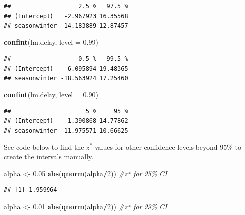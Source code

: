 \documentclass[
]{book}
\newenvironment{Shaded}{\begin{snugshade}}{\end{snugshade}}
\newcommand{\AttributeTok}[1]{\textcolor[rgb]{0.13,0.29,0.53}{#1}}
\newcommand{\CommentTok}[1]{\textcolor[rgb]{0.56,0.35,0.01}{\textit{#1}}}
\newcommand{\DecValTok}[1]{\textcolor[rgb]{0.00,0.00,0.81}{#1}}
\newcommand{\FloatTok}[1]{\textcolor[rgb]{0.00,0.00,0.81}{#1}}
\newcommand{\FunctionTok}[1]{\textcolor[rgb]{0.13,0.29,0.53}{\textbf{#1}}}
\newcommand{\NormalTok}[1]{#1}
\newcommand{\OtherTok}[1]{\textcolor[rgb]{0.56,0.35,0.01}{#1}}
\newcommand{\SpecialCharTok}[1]{\textcolor[rgb]{0.81,0.36,0.00}{\textbf{#1}}}
\begin{document}
\begin{verbatim}
##                   2.5 %   97.5 %
## (Intercept)   -2.967923 16.35568
## seasonwinter -14.183889 12.87457
\end{verbatim}

\begin{Shaded}
\begin{Highlighting}[]
\FunctionTok{confint}\NormalTok{(lm.delay, }\AttributeTok{level =} \FloatTok{0.99}\NormalTok{)}
\end{Highlighting}
\end{Shaded}

\begin{verbatim}
##                   0.5 %   99.5 %
## (Intercept)   -6.095894 19.48365
## seasonwinter -18.563924 17.25460
\end{verbatim}

\begin{Shaded}
\begin{Highlighting}[]
\FunctionTok{confint}\NormalTok{(lm.delay, }\AttributeTok{level =} \FloatTok{0.90}\NormalTok{)}
\end{Highlighting}
\end{Shaded}

\begin{verbatim}
##                     5 %     95 %
## (Intercept)   -1.390868 14.77862
## seasonwinter -11.975571 10.66625
\end{verbatim}

See code below to find the \(z^*\) values for other confidence levels beyond 95\% to create the intervals manually.

\begin{Shaded}
\begin{Highlighting}[]
\NormalTok{alpha }\OtherTok{\textless{}{-}} \FloatTok{0.05} 
\FunctionTok{abs}\NormalTok{(}\FunctionTok{qnorm}\NormalTok{(alpha}\SpecialCharTok{/}\DecValTok{2}\NormalTok{)) }\CommentTok{\#z* for 95\% CI}
\end{Highlighting}
\end{Shaded}

\begin{verbatim}
## [1] 1.959964
\end{verbatim}

\begin{Shaded}
\begin{Highlighting}[]
\NormalTok{alpha }\OtherTok{\textless{}{-}} \FloatTok{0.01} 
\FunctionTok{abs}\NormalTok{(}\FunctionTok{qnorm}\NormalTok{(alpha}\SpecialCharTok{/}\DecValTok{2}\NormalTok{)) }\CommentTok{\#z* for 99\% CI}
\end{Highlighting}
\end{Shaded}
\end{document}
